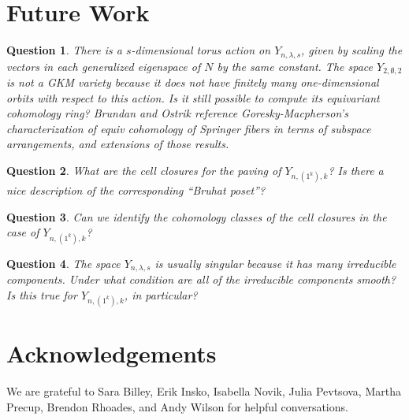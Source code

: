 \documentclass[12pt]{amsart}
\newcommand{\la}{\lambda}
\newtheorem{question}{Question}
\begin{document}
\section{Future Work}\label{sec:FutureWork}

\begin{question}
There is a $s$-dimensional torus action on $Y_{n,\la,s}$, given by scaling the vectors in each generalized eigenspace of $N$ by the same constant. The space $Y_{2,\emptyset,2}$ is not a GKM variety because it does not have finitely many one-dimensional orbits with respect to this action. Is it still possible to compute its equivariant cohomology ring? Brundan and Ostrik reference Goresky-Macpherson's characterization of equiv cohomology of Springer fibers in terms of subspace arrangements, and extensions of those results.
\end{question}

\begin{question}
What are the cell closures for the paving of $Y_{n,(1^k),k}$? Is there a nice description of the corresponding ``Bruhat poset''?
\end{question}

\begin{question}
Can we identify the cohomology classes of the cell closures in the case of $Y_{n,(1^k),k}$?
\end{question}

 
 
 \begin{question}
 The space $Y_{n,\la,s}$ is usually singular because it has many irreducible components. Under what condition are all of the irreducible components smooth? Is this true for $Y_{n,(1^k),k}$, in particular?
 \end{question}


\section{Acknowledgements}

We are grateful to Sara Billey, Erik Insko, Isabella Novik, Julia Pevtsova, Martha Precup, Brendon Rhoades, and Andy Wilson for helpful conversations.




\end{document}
